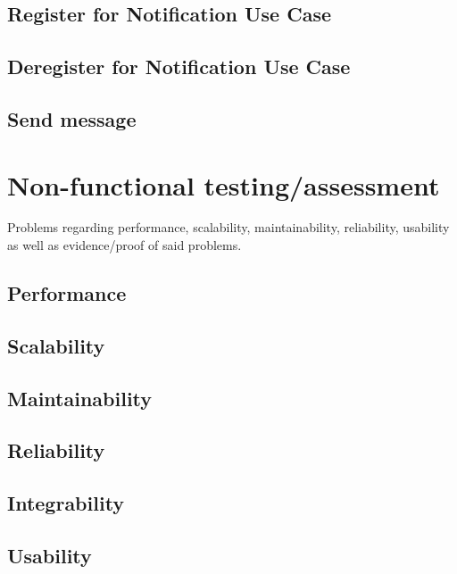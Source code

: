 \documentclass[a4paper,12pt,titlepage]{article}
\begin{document}
\subsection{Register for Notification Use Case}
	
	
\subsection{Deregister for Notification Use Case}
	
	
\subsection{Send message}
	

\newpage

\section{Non-functional testing/assessment}
Problems regarding performance, scalability, maintainability, reliability, usability as well as evidence/proof of said problems.

\subsection{Performance}
	
	
\subsection{Scalability}
	
	
\subsection{Maintainability}
	
	
\subsection{Reliability}
	

\subsection{Integrability}
	
	
\subsection{Usability}
%	
	
\end{document}
